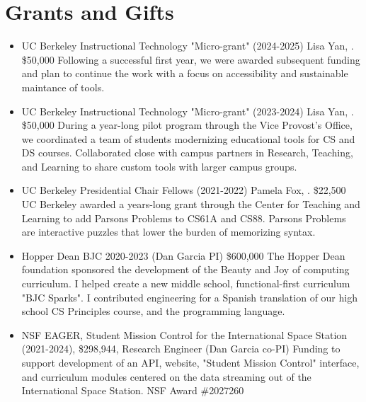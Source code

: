 \section{Grants and Gifts}
\vspace{6pt}

\begin{itemize}

  \setlength\itemsep{1em}

    \item{UC Berkeley Instructional Technology "Micro-grant" (2024-2025) Lisa Yan, \firstme. \$50,000
    \newline
    Following a successful first year, we were awarded subsequent funding and plan to continue the work with a focus on accessibility and sustainable maintance of tools.
    }
    
    \item{UC Berkeley Instructional Technology "Micro-grant" (2023-2024) Lisa Yan, \firstme. \$50,000
    \newline
    During a year-long pilot program through the Vice Provost's Office, we coordinated a team of students modernizing educational tools for CS and DS courses. Collaborated close with campus partners in Research, Teaching, and Learning to share custom tools with larger campus groups.}
    
    \item{UC Berkeley Presidential Chair Fellows (2021-2022) Pamela Fox, \firstme. \$22,500
    \newline
    UC Berkeley awarded a years-long grant through the Center for Teaching and Learning to add Parsons Problems to CS61A and CS88. Parsons Problems are interactive puzzles that lower the burden of memorizing syntax.
    }
    
    \item{Hopper Dean BJC 2020-2023 (Dan Garcia PI) \$600,000
    \newline
    The Hopper Dean foundation sponsored the development of the Beauty and Joy of computing curriculum. I helped create a new middle school, functional-first curriculum "BJC Sparks". I contributed engineering for a Spanish translation of our high school CS Principles course, and the \snap programming language.}
    
    \item{NSF EAGER, Student Mission Control for the International Space Station (2021-2024),
    \$298,944, Research Engineer (Dan Garcia co-PI)
    Funding to support development of an API, website, "Student Mission Control" interface, and curriculum modules centered on the data streaming out of the International Space Station. NSF Award \#2027260}


\end{itemize}
